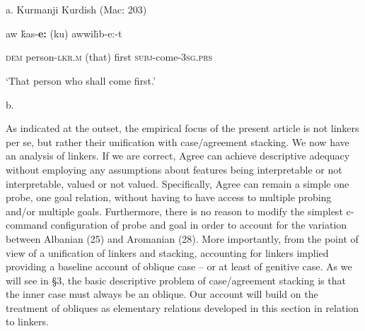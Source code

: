 \documentclass[output=paper]{langsci/langscibook}
\begin{document}
\begin{styleSfondomedioiColorexxi}
\ea%
    \label{ex:key:29}
    \gll\\
        \\
    \glt
    \z

          a.  Kurmanji Kurdish (Mac\citealt{Kenzie1961}: 203)
\end{styleSfondomedioiColorexxi}

\begin{styleSfondomedioiColorexxi}
aw   ḱas-\textbf{e:}     (ku)   awwil\=\i   b-e:-t   
\end{styleSfondomedioiColorexxi}

\begin{styleSfondomedioiColorexxi}
\textsc{dem}  person-\textsc{lkr.m}   (that)   first     \textsc{subj}{}-come-\textsc{3sg.prs}
\end{styleSfondomedioiColorexxi}

\begin{styleGrigliamediaiiColorexi}
‘That person who shall come first.’  
\end{styleGrigliamediaiiColorexi}

\begin{styleSfondomedioiColorexxi}
  b.        
\end{styleSfondomedioiColorexxi}

 
\begin{styleGrigliamediaiiColorexi}
As indicated at the outset, the empirical focus of the present article is not linkers per se, but rather their unification with case/agreement stacking. We now have an analysis of linkers. If we are correct, Agree can achieve descriptive adequacy without employing any assumptions about features being interpretable or not interpretable, valued or not valued. Specifically, Agree can remain a simple one probe, one goal relation, without having to have access to multiple probing and/or multiple goals. Furthermore, there is no reason to modify the simplest c-command configuration of probe and goal in order to account for the variation between Albanian (25) and Aromanian (28).  More importantly, from the point of view of a unification of linkers and stacking, accounting for linkers implied providing a baseline account of oblique case – or at least of genitive case. As we will see in §3, the basic descriptive problem of case/agreement stacking is that the inner case must always be an oblique. Our account will build on the treatment of obliques as elementary relations developed in this section in relation to linkers.
\end{styleGrigliamediaiiColorexi}
\end{document}
